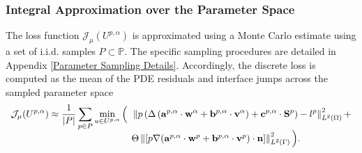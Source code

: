 \documentclass[oneside]{article}
\begin{document}
\subsubsection*{ Integral Approximation over the Parameter Space}
The loss function ${\mathcal{J}}_\mu(U^{p, \alpha})$ is approximated using a Monte Carlo estimate using a set of i.i.d. samples $P \subset \mathbb{P}$. The specific sampling procedures are detailed in Appendix \ref{Parameter Sampling Details}. Accordingly, the discrete loss is computed as the mean of the PDE residuals and interface jumps across the sampled parameter space
\begin{equation}\label{eq_parameter-discretization_loss}
\begin{array}{rl}
\displaystyle
{\mathcal{J}}_\mu(U^{p, \alpha}) \approx  \frac{1}{|P|} \sum_{p \in P} \min_{u \in U^{p, \alpha}}\Big( &\hspace{-2mm} \displaystyle  \,\left\Vert p \left( \Delta \left(\mathbf{a}^{p, \alpha}\cdot\mathbf{w}^{\alpha} + \mathbf{b}^{p, \alpha}\cdot\mathbf{v}^{\alpha}\right) + {\mathbf{c}^{p, \alpha}}\cdot \mathbf{S}^{p} \right) - l^p \right\Vert^2_{L^2(\Omega)} + \\
&\hspace{-2mm}\Theta\left\Vert [p \nabla (\mathbf{a}^{p, \alpha}\cdot \mathbf{w}^{p} + \mathbf{b}^{p, \alpha}\cdot \mathbf{v}^{p}) \cdot \mathbf{n}] \right\Vert_{L^2(\Gamma)}^2 
\Big).
\end{array}
\end{equation}
\end{document}
